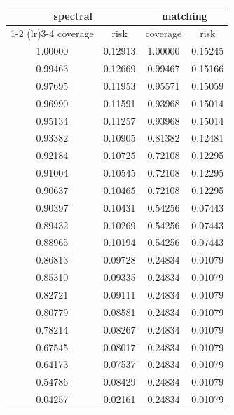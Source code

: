 \begin{tabular}{cccc}
\toprule
\multicolumn{2}{c}{spectral} & \multicolumn{2}{c}{matching} \\
\cmidrule(lr){1-2} \cmidrule(lr){3-4}
coverage & risk & coverage & risk \\
\midrule
1.00000 & 0.12913 & 1.00000 & 0.15245 \\
0.99463 & 0.12669 & 0.99467 & 0.15166 \\
0.97695 & 0.11953 & 0.95571 & 0.15059 \\
0.96990 & 0.11591 & 0.93968 & 0.15014 \\
0.95134 & 0.11257 & 0.93968 & 0.15014 \\
0.93382 & 0.10905 & 0.81382 & 0.12481 \\
0.92184 & 0.10725 & 0.72108 & 0.12295 \\
0.91004 & 0.10545 & 0.72108 & 0.12295 \\
0.90637 & 0.10465 & 0.72108 & 0.12295 \\
0.90397 & 0.10431 & 0.54256 & 0.07443 \\
0.89432 & 0.10269 & 0.54256 & 0.07443 \\
0.88965 & 0.10194 & 0.54256 & 0.07443 \\
0.86813 & 0.09728 & 0.24834 & 0.01079 \\
0.85310 & 0.09335 & 0.24834 & 0.01079 \\
0.82721 & 0.09111 & 0.24834 & 0.01079 \\
0.80779 & 0.08581 & 0.24834 & 0.01079 \\
0.78214 & 0.08267 & 0.24834 & 0.01079 \\
0.67545 & 0.08017 & 0.24834 & 0.01079 \\
0.64173 & 0.07537 & 0.24834 & 0.01079 \\
0.54786 & 0.08429 & 0.24834 & 0.01079 \\
0.04257 & 0.02161 & 0.24834 & 0.01079 \\
\bottomrule
\end{tabular}
